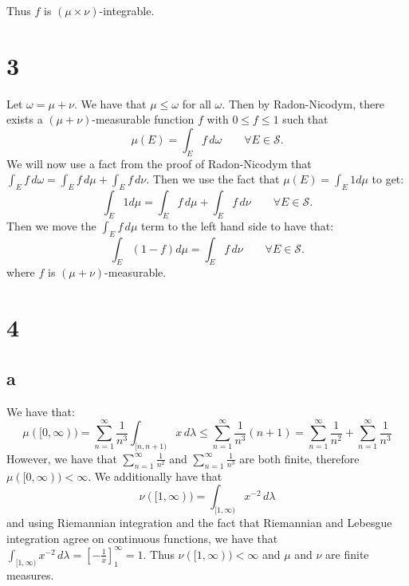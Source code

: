 \documentclass{article}
\theoremstyle{definition}
\numberwithin{theorem}{section}
\numberwithin{equation}{section}
\begin{document}
Thus $f$ is $(\mu \times \nu)$-integrable. 

\section{3}
Let $\omega = \mu + \nu$. We have that $\mu \leq \omega$ for all $\omega$. Then by Radon-Nicodym, there exists a $(\mu + \nu)$-measurable function $f$ with $0 \leq f \leq 1$ such that
\begin{equation}
	\mu(E) = \int_E f \, d\omega \qquad \forall E \in \mathcal{S}.
\end{equation} 
We will now use a fact from the proof of Radon-Nicodym that $\int_E f \, d\omega = \int_E f \, d\mu +  \int_E f \, d\nu$. Then we use the fact that $\mu(E) = \int_E 1 d\mu$ to get:
\begin{equation}
	\int_E 1 d\mu = \int_E f \, d\mu +  \int_E f \, d\nu \qquad \forall E \in \mathcal{S}.
\end{equation}
Then we move the $\int_E f \, d\mu$ term to the left hand side to have that:
\begin{equation}
	\int_E \left(1 - f\right) d\mu = \int_E f \, d\nu \qquad \forall E \in \mathcal{S}.
\end{equation}
where $f$ is $(\mu + \nu)$-measurable. 
\section{4}

\subsection{a}
We have that:
\begin{equation}
	\mu([0, \infty)) = \sum_{n = 1}^{\infty} \frac{1}{n^3} \int_{[n, n + 1)} x \, d\lambda \leq \sum_{n = 1}^{\infty} \frac{1}{n^3} (n + 1) = \sum_{n = 1}^{\infty} \frac{1}{n^2} + \sum_{n = 1}^{\infty} \frac{1}{n^3}
\end{equation}
However, we have that $\sum_{n = 1}^{\infty} \frac{1}{n^2}$ and $\sum_{n = 1}^{\infty} \frac{1}{n^3}$ are both finite, therefore $\mu([0, \infty)) < \infty$. 
We additionally have that
\begin{equation}
	\nu([1, \infty)) = \int_{[1, \infty)} x^{-2} \, d\lambda
\end{equation}
and using Riemannian integration and the fact that Riemannian and Lebesgue integration agree on continuous functions, we have that $\int_{[1, \infty)} x^{-2} \, d\lambda = \left[ -\frac{1}{x} \right]^\infty_{1} = 1$. Thus $\nu([1, \infty)) < \infty$ and $\mu$ and $\nu$ are finite measures. 
\end{document}
